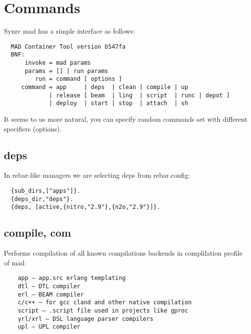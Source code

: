 \section{Commands}

Synrc mad has a simple interface as follows:

\vspace{1\baselineskip}
\begin{lstlisting}
  MAD Container Tool version b547fa
  BNF:
      invoke = mad params
      params = [] | run params
         run = command [ options ]
     command = app     | deps  | clean | compile | up
             | release [ beam  | ling  | script  | runc | depot ]
             | deploy  | start | stop  | attach  | sh
\end{lstlisting}
\vspace{1\baselineskip}

It seems to us more natural, you can specify random
commands set with different specifiers (options).

\subsection{deps}

In rebar-like managers we are selecting deps from rebar.config:
\vspace{1\baselineskip}
\begin{lstlisting}
  {sub_dirs,["apps"]}.
  {deps_dir,"deps"}.
  {deps, [active,{nitro,"2.9"},{n2o,"2.9"}]}.
\end{lstlisting}
\vspace{1\baselineskip}


\subsection{compile, com}
Performs compilation of all known compilations backends in complilation profile of mad:
\vspace{1\baselineskip}
\begin{lstlisting}
    app — app.src erlang templating
    dtl — DTL compiler
    erl — BEAM compiler
    c/c++ — for gcc cland and other native compilation
    script — .script file used in projects like gproc
    yrl/xrl — DSL language parser compilers
    upl — UPL compiler
\end{lstlisting}
\vspace{1\baselineskip}

